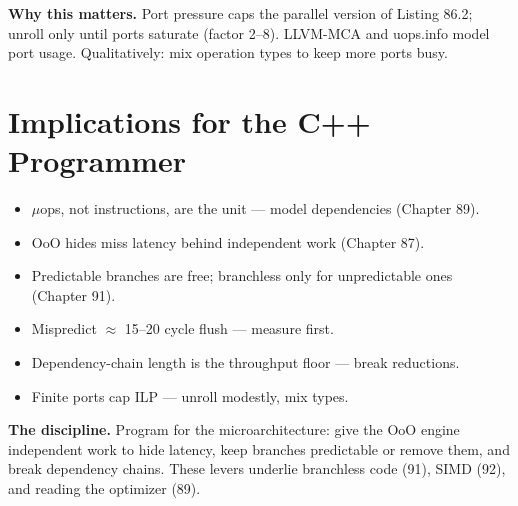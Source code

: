 \textbf{Why this matters.} Port pressure caps the parallel version of Listing 86.2; unroll only until ports saturate (factor 2--8). LLVM-MCA and uops.info model port usage. Qualitatively: mix operation types to keep more ports busy.

\section{Implications for the C++ Programmer}
\begin{itemize}
\item \(\mu\)ops, not instructions, are the unit --- model dependencies (Chapter 89).
\item OoO hides miss latency behind independent work (Chapter 87).
\item Predictable branches are free; branchless only for unpredictable ones (Chapter 91).
\item Mispredict $\approx$ 15--20 cycle flush --- measure first.
\item Dependency-chain length is the throughput floor --- break reductions.
\item Finite ports cap ILP --- unroll modestly, mix types.
\end{itemize}

\textbf{The discipline.} Program for the microarchitecture: give the OoO engine independent work to hide latency, keep branches predictable or remove them, and break dependency chains. These levers underlie branchless code (91), SIMD (92), and reading the optimizer (89).
